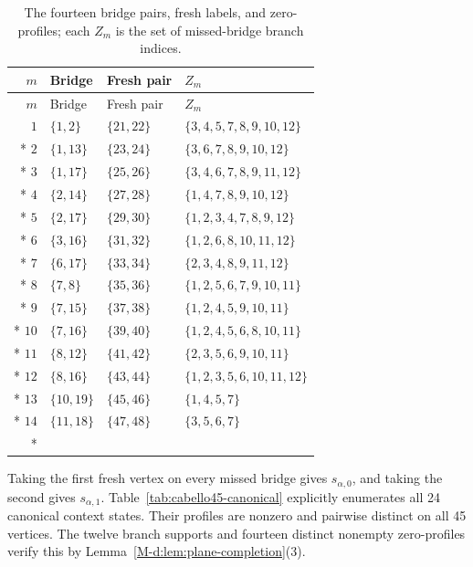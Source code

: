 \documentclass[aps,pra,reprint,superscriptaddress,longbibliography,nofootinbib,floatfix,10pt]{revtex4-2}
\theoremstyle{definition}
\begin{document}
\begin{longtable}{rlll}
\caption{The fourteen bridge pairs, fresh labels, and zero-profiles; each $Z_m$ is the set of missed-bridge branch indices.}\label{tab:cabello45-zero-profiles}\\
\toprule
$m$ & Bridge & Fresh pair & $Z_m$\\\midrule
\endfirsthead
\toprule
$m$ & Bridge & Fresh pair & $Z_m$\\\midrule
\endhead
\bottomrule\endfoot
$1$ & $\{1,2\}$ & $\{21,22\}$ & $\{3,4,5,7,8,9,10,12\}$\\*
$2$ & $\{1,13\}$ & $\{23,24\}$ & $\{3,6,7,8,9,10,12\}$\\*
$3$ & $\{1,17\}$ & $\{25,26\}$ & $\{3,4,6,7,8,9,11,12\}$\\*
$4$ & $\{2,14\}$ & $\{27,28\}$ & $\{1,4,7,8,9,10,12\}$\\*
$5$ & $\{2,17\}$ & $\{29,30\}$ & $\{1,2,3,4,7,8,9,12\}$\\*
$6$ & $\{3,16\}$ & $\{31,32\}$ & $\{1,2,6,8,10,11,12\}$\\*
$7$ & $\{6,17\}$ & $\{33,34\}$ & $\{2,3,4,8,9,11,12\}$\\*
$8$ & $\{7,8\}$ & $\{35,36\}$ & $\{1,2,5,6,7,9,10,11\}$\\*
$9$ & $\{7,15\}$ & $\{37,38\}$ & $\{1,2,4,5,9,10,11\}$\\*
$10$ & $\{7,16\}$ & $\{39,40\}$ & $\{1,2,4,5,6,8,10,11\}$\\*
$11$ & $\{8,12\}$ & $\{41,42\}$ & $\{2,3,5,6,9,10,11\}$\\*
$12$ & $\{8,16\}$ & $\{43,44\}$ & $\{1,2,3,5,6,10,11,12\}$\\*
$13$ & $\{10,19\}$ & $\{45,46\}$ & $\{1,4,5,7\}$\\*
$14$ & $\{11,18\}$ & $\{47,48\}$ & $\{3,5,6,7\}$\\*
\end{longtable}
\endgroup
Taking the first fresh vertex on every missed bridge gives
$s_{\alpha,0}$, and taking the second gives $s_{\alpha,1}$.
Table~\ref{tab:cabello45-canonical} explicitly enumerates all 24
canonical context states. Their profiles are nonzero and pairwise
distinct on all 45 vertices. The twelve branch supports and fourteen
distinct nonempty zero-profiles verify this by
Lemma~\ref{M-d:lem:plane-completion}(3).
\begingroup\small
{}
\end{document}

